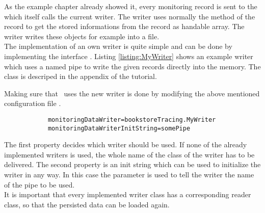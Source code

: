 		As the example chapter already showed it, every monitoring record is sent to the  which itself calls the current writer. The writer uses normally the  method of the record to get the stored informations from the record as handable array. The writer writes these objects for example into a file.\\
		The implementation of an own writer is quite simple and can be done by implementing the interface . Listing \ref{listing:MyWriter} shows an example writer which uses a named pipe to write the given records directly into the memory. The class  is descriped in the appendix of the tutorial. 

		\setJavaCodeListing
		

		Making sure that \Kieker\  uses the new writer is done by modifying the above mentioned configuration file \dir{\monitoringPropertiesFile}.

		\setBashListing       
		\begin{lstlisting}
			monitoringDataWriter=bookstoreTracing.MyWriter
			monitoringDataWriterInitString=somePipe
		\end{lstlisting}

		The first property decides which writer should be used. If none of the already implemented writers is used, the whole name of the class of the writer has to be delivered. The second property is an init string which can be used to initialize the writer in any way. In this case the parameter is used to tell the writer the name of the pipe to be used.\\
		\warning It is important that every implemented writer class has a corresponding reader class, so that the persisted data can be loaded again.

